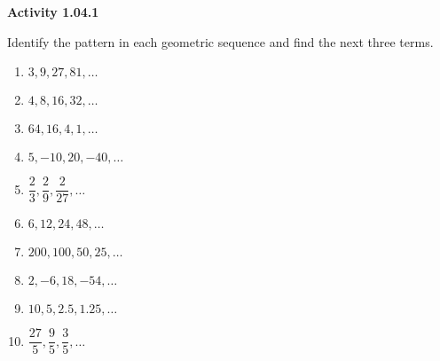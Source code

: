 \vspace{0.3ex}
\noindent\textbf{Activity 1.04.1}

\vspace{0.2ex}

Identify the pattern in each geometric sequence and find the next three terms.
\begin{multicols}{2}
\begin{enumerate}
\item $3, 9, 27, 81, \dots$
    \item $4, 8, 16, 32, \dots$
    \item $64, 16, 4, 1, \dots$
    \item $5, -10, 20, -40, \dots$
    \item $\dfrac{2}{3}, \dfrac{2}{9}, \dfrac{2}{27}, \dots$
    \item $6, 12, 24, 48, \dots$
    \item $200, 100, 50, 25, \dots$
    \item $2, -6, 18, -54, \dots$
    \item $10, 5, 2.5, 1.25, \dots$
    \item $\dfrac{27}{5}, \dfrac{9}{5}, \dfrac{3}{5}, \dots$
\end{enumerate}
\end{multicols}
